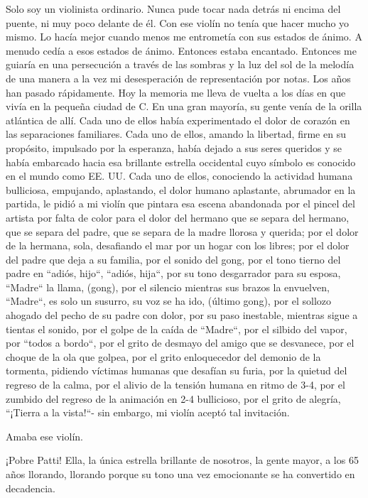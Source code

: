 \documentclass[12pt]{book}
\begin{document}
Solo soy un violinista ordinario. Nunca pude tocar nada detrás ni encima del puente, ni muy poco delante de él. Con ese violín no tenía que hacer mucho yo mismo. Lo hacía mejor cuando menos me entrometía con sus estados de ánimo. A menudo cedía a esos estados de ánimo. Entonces estaba encantado. Entonces me guiaría en una persecución a través de las sombras y la luz del sol de la melodía de una manera a la vez mi desesperación de representación por notas. Los años han pasado rápidamente. Hoy la memoria me lleva de vuelta a los días en que vivía en la pequeña ciudad de C. En una gran mayoría, su gente venía de la orilla atlántica de allí. Cada uno de ellos había experimentado el dolor de corazón en las separaciones familiares. Cada uno de ellos, amando la libertad, firme en su propósito, impulsado por la esperanza, había dejado a sus seres queridos y se había embarcado hacia esa brillante estrella occidental cuyo símbolo es conocido en el mundo como EE. UU. Cada uno de ellos, conociendo la actividad humana bulliciosa, empujando, aplastando, el dolor humano aplastante, abrumador en la partida, le pidió a mi violín que pintara esa escena abandonada por el pincel del artista por falta de color para el dolor del hermano que se separa del hermano, que se separa del padre, que se separa de la madre llorosa y querida; por el dolor de la hermana, sola, desafiando el mar por un hogar con los libres; por el dolor del padre que deja a su familia, por el sonido del gong, por el tono tierno del padre en ``adiós, hijo``, ``adiós, hija``, por su tono desgarrador para su esposa, ``Madre`` la llama, (gong), por el silencio mientras sus brazos la envuelven, ``Madre``, es solo un susurro, su voz se ha ido, (último gong), por el sollozo ahogado del pecho de su padre con dolor, por su paso inestable, mientras sigue a tientas el sonido, por el golpe de la caída de ``Madre``, por el silbido del vapor, por ``todos a bordo``, por el grito de desmayo del amigo que se desvanece, por el choque de la ola que golpea, por el grito enloquecedor del demonio de la tormenta, pidiendo víctimas humanas que desafían su furia, por la quietud del regreso de la calma, por el alivio de la tensión humana en ritmo de 3-4, por el zumbido del regreso de la animación en 2-4 bullicioso, por el grito de alegría, ``¡Tierra a la vista!``- sin embargo, mi violín aceptó tal invitación.

Amaba ese violín.

¡Pobre Patti! Ella, la única estrella brillante de nosotros, la gente mayor, a los 65 años llorando, llorando porque su tono una vez emocionante se ha convertido en decadencia.
\end{document}
